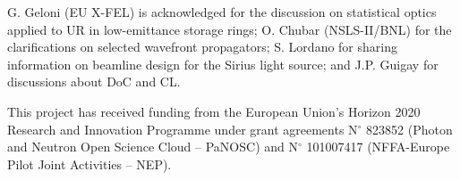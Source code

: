 \documentclass{iucr}
\begin{document}


{}

G. Geloni (EU X-FEL) is acknowledged for the discussion on statistical optics applied to UR in low-emittance storage rings; O. Chubar (NSLS-II/BNL) for the clarifications on selected wavefront propagators; S. Lordano for sharing information on beamline design for the Sirius light source; and J.P. Guigay for discussions about DoC and CL.


This project has received funding from the European Union’s Horizon 2020 Research and Innovation Programme under grant agreements N$^{\circ}$ 823852 (Photon and Neutron Open Science Cloud -- PaNOSC) and N$^{\circ}$ 101007417 (NFFA-Europe Pilot Joint Activities -- NEP).

\newpage
{}

\end{document}
